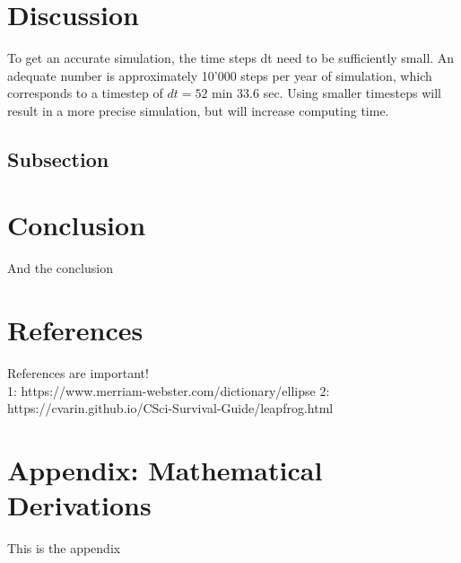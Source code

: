 \documentclass[reprint,english,notitlepage]{revtex4-2}
\begin{document}
\section{Discussion}
To get an accurate simulation, the time steps dt need to be sufficiently small.
An adequate number is approximately 10'000 steps per year of simulation, which corresponds to a timestep of $dt = 52$ min $33.6$ sec.
Using smaller timesteps will result in a more precise simulation, but will increase computing time.
	\subsection{Subsection}

\section{Conclusion}
And the conclusion


\section{References}
References are important!\\
1: https://www.merriam-webster.com/dictionary/ellipse
2: https://cvarin.github.io/CSci-Survival-Guide/leapfrog.html

\section{Appendix: Mathematical Derivations}
This is the appendix
\end{document}
